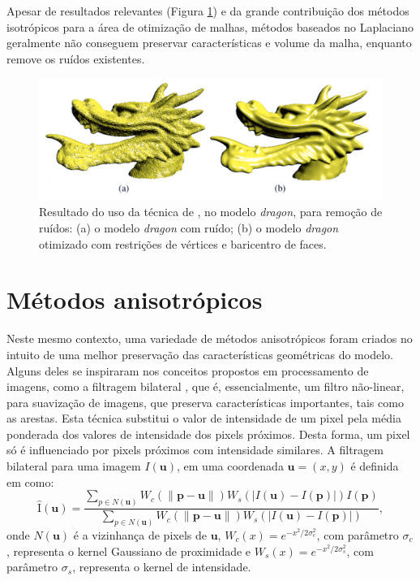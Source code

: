 Apesar de resultados relevantes (Figura \ref{fig:dragon_laplaciano_global}) e da grande contribuição dos métodos isotrópicos para a área de otimização de malhas, métodos baseados no Laplaciano geralmente não conseguem preservar características e volume da malha, enquanto remove os ruídos existentes.

\clearpage

\begin{figure}[!h]
\captionsetup{width=\linewidth}
\centering
\includegraphics[scale=0.28]{figuras/dragon_laplaciano_global.png}
\caption{Resultado do uso da técnica de \cite{liu2007non}, no modelo \textit{dragon}, para remoção de ruídos: (a) o modelo \textit{dragon} com ruído; (b) o modelo \textit{dragon} otimizado com restrições de vértices e baricentro de faces.}
\label{fig:dragon_laplaciano_global}
\end{figure}


\section{Métodos anisotrópicos}

Neste mesmo contexto, uma variedade de métodos anisotrópicos foram criados no intuito de uma melhor preservação das características geométricas do modelo. Alguns deles se inspiraram nos conceitos propostos em processamento de imagens, como a filtragem bilateral \cite{tomasi1998bilateral}, que é, essencialmente, um filtro não-linear, para suavização de imagens, que preserva características importantes, tais como as arestas. Esta técnica substitui o valor de intensidade de um pixel pela média ponderada dos valores de intensidade dos pixels próximos. Desta forma, um pixel só é influenciado por pixels próximos com intensidade similares. A filtragem bilateral para uma imagem $I(\mathbf{u})$, em uma coordenada $\mathbf{u} = (x,y)$ é definida em \cite{tomasi1998bilateral} como:
\begin{equation}\label{eq:filtro_bilateral} 
    \hat{\mathrm{I}}(\mathbf{u}) = \frac{\sum_{p \in N(\mathbf{u})}{W_c(\|\mathbf{p}-\mathbf{u}\|)W_s(|I(\mathbf{u})-I(\mathbf{p})|)I(\mathbf{p})}}{ \sum_{p \in N(\mathbf{u})}{W_c(\|\mathbf{p}-\mathbf{u}\|)W_s(|I(\mathbf{u})-I(\mathbf{p})|)} },
\end{equation}
onde $N(\mathbf{u})$ é a vizinhança de pixels de $\mathbf{u}$, $W_c(x) = e^{-x^2/2\sigma_c^2}$, com parâmetro $\sigma_c$, representa o kernel Gaussiano de proximidade e $W_s(x) = e^{-x^2/2\sigma_s^2}$, com parâmetro $\sigma_s$, representa o kernel de intensidade.

